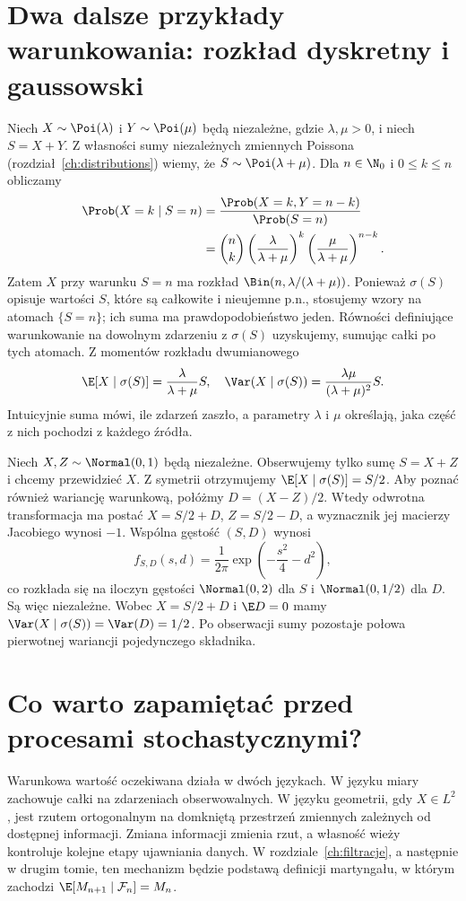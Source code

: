 \section{Dwa dalsze przykłady warunkowania: rozkład dyskretny i gaussowski}

\begin{przyklad}
Niech $X\sim\Poi(\lambda)$ i $Y\sim\Poi(\mu)$ będą
niezależne, gdzie $\lambda,\mu>0$, i niech $S=X+Y$.
Z własności sumy niezależnych zmiennych Poissona (rozdział~\ref{ch:distributions}) wiemy, że $S\sim\Poi(\lambda+\mu)$.
Dla $n\in\N_0$ i $0\leq k\leq n$ obliczamy
\begin{align*}
\Prob(X=k\mid S=n)
&=\frac{\Prob(X=k,Y=n-k)}{\Prob(S=n)}\\
&=\binom nk\left(\frac{\lambda}{\lambda+\mu}\right)^k
\left(\frac{\mu}{\lambda+\mu}\right)^{n-k}.
\end{align*}
Zatem $X$ przy warunku $S=n$ ma rozkład
$\Bin(n,\lambda/(\lambda+\mu))$. Ponieważ
$\sigma(S)$ opisuje wartości $S$, które są całkowite
i nieujemne p.n., stosujemy wzory na atomach
$\{S=n\}$; ich suma ma prawdopodobieństwo jeden.
Równości definiujące warunkowanie na dowolnym
zdarzeniu z $\sigma(S)$ uzyskujemy, sumując całki
po tych atomach. Z momentów rozkładu dwumianowego
\[
\E[X\mid\sigma(S)]
=\frac{\lambda}{\lambda+\mu}S,
\quad
\Var(X\mid\sigma(S))
=\frac{\lambda\mu}{(\lambda+\mu)^2}S.
\]
Intuicyjnie suma mówi, ile zdarzeń zaszło,
a parametry $\lambda$ i $\mu$ określają,
jaka część z nich pochodzi z każdego źródła.
\end{przyklad}

\begin{przyklad}
Niech $X,Z\sim\Normal(0,1)$ będą niezależne.
Obserwujemy tylko sumę $S=X+Z$ i chcemy
przewidzieć $X$. Z symetrii otrzymujemy
$\E[X\mid\sigma(S)]=S/2$.
Aby poznać również wariancję warunkową,
połóżmy $D=(X-Z)/2$. Wtedy
odwrotna transformacja ma postać
$X=S/2+D$, $Z=S/2-D$, a wyznacznik jej macierzy
Jacobiego wynosi $-1$. Wspólna gęstość
$(S,D)$ wynosi
\[
f_{S,D}(s,d)=\frac1{2\pi}
\exp\left(-\frac{s^2}{4}-d^2\right),
\]
co rozkłada się na iloczyn gęstości
$\Normal(0,2)$ dla $S$ i $\Normal(0,1/2)$
dla $D$. Są więc niezależne.
Wobec $X=S/2+D$ i $\E D=0$ mamy
$\Var(X\mid\sigma(S))=\Var(D)=1/2$.
Po obserwacji sumy pozostaje połowa pierwotnej
wariancji pojedynczego składnika.
\end{przyklad}

\section{Co warto zapamiętać przed procesami stochastycznymi?}
Warunkowa wartość oczekiwana działa w dwóch językach.
W języku miary zachowuje całki na zdarzeniach
obserwowalnych. W języku geometrii, gdy $X\in L^2$, jest rzutem
ortogonalnym na domkniętą przestrzeń zmiennych
zależnych od dostępnej informacji. Zmiana informacji
zmienia rzut, a własność wieży kontroluje kolejne
etapy ujawniania danych. W rozdziale~\ref{ch:filtracje}, a następnie w drugim tomie,
ten mechanizm będzie podstawą definicji martyngału,
w którym zachodzi $\E[M_{n+1}\mid\mathcal F_n]=M_n$.
